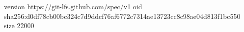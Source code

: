 version https://git-lfs.github.com/spec/v1
oid sha256:d0df78cb00bc324c7d9ddcf76af6772c7314ae13723cc8c98ae04d813f1bc550
size 22000
